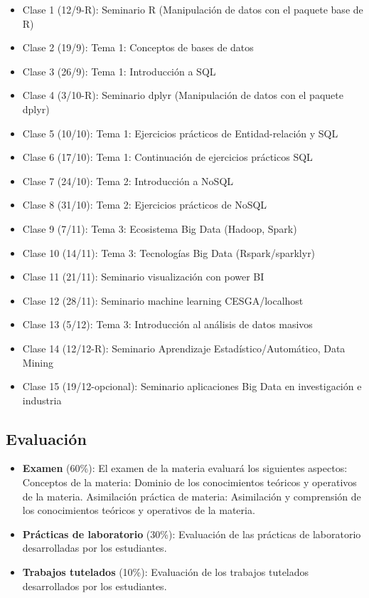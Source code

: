\documentclass[]{book}
\begin{document}
\begin{itemize}
\item
  Clase 1 (12/9-R): Seminario R (Manipulación de datos con el paquete base de R)
\item
  Clase 2 (19/9): Tema 1: Conceptos de bases de datos
\item
  Clase 3 (26/9): Tema 1: Introducción a SQL
\item
  Clase 4 (3/10-R): Seminario dplyr (Manipulación de datos con el paquete dplyr)
\item
  Clase 5 (10/10): Tema 1: Ejercicios prácticos de Entidad-relación y SQL
\item
  Clase 6 (17/10): Tema 1: Continuación de ejercicios prácticos SQL
\item
  Clase 7 (24/10): Tema 2: Introducción a NoSQL
\item
  Clase 8 (31/10): Tema 2: Ejercicios prácticos de NoSQL
\item
  Clase 9 (7/11): Tema 3: Ecosistema Big Data (Hadoop, Spark)
\item
  Clase 10 (14/11): Tema 3: Tecnologías Big Data (Rspark/sparklyr)
\item
  Clase 11 (21/11): Seminario visualización con power BI
\item
  Clase 12 (28/11): Seminario machine learning CESGA/localhost
\item
  Clase 13 (5/12): Tema 3: Introducción al análisis de datos masivos
\item
  Clase 14 (12/12-R): Seminario Aprendizaje Estadístico/Automático, Data Mining
\item
  Clase 15 (19/12-opcional): Seminario aplicaciones Big Data en investigación e industria
\end{itemize}

\hypertarget{evaluacion}{%
\subsection{Evaluación}\label{evaluacion}}

\begin{itemize}
\item
  \textbf{Examen} (60\%): El examen de la materia evaluará los siguientes aspectos:
  Conceptos de la materia: Dominio de los conocimientos teóricos y operativos de la materia.
  Asimilación práctica de materia: Asimilación y comprensión de los conocimientos teóricos y operativos de la materia.
\item
  \textbf{Prácticas de laboratorio} (30\%): Evaluación de las prácticas de laboratorio desarrolladas por los estudiantes.
\item
  \textbf{Trabajos tutelados} (10\%): Evaluación de los trabajos tutelados desarrollados por los estudiantes.
\end{itemize}
\end{document}
